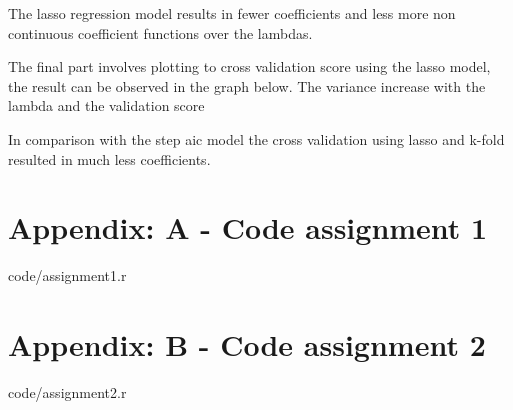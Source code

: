 \documentclass[a4paper,12pt]{article}
\begin{document}
The lasso regression model results in fewer coefficients and less more non continuous coefficient functions over the lambdas. 

The final part involves plotting to cross validation score using the lasso model, the result can be observed in the graph below. The variance increase with the lambda and the validation score  

In comparison with the step aic model the cross validation using lasso and k-fold resulted in much less coefficients. 


\section{Appendix: A - Code assignment 1}


    {code/assignment1.r}

\section{Appendix: B - Code assignment 2}


    {code/assignment2.r}
\end{document}

